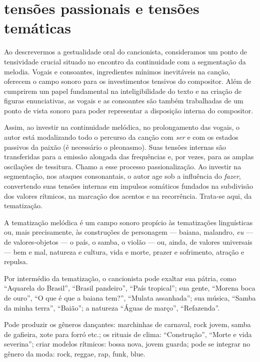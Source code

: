\section{tensões passionais e tensões temáticas}

Ao descrevermos a gestualidade oral do cancionista, consideramos um
ponto de tensividade crucial situado no encontro da continuidade com a
segmentação da melodia. Vogais e consoantes, ingredientes mínimos
inevitáveis na canção, oferecem o campo sonoro para os investimentos
tensivos do compositor. Além de cumprirem um papel fundamental na
inteligibilidade do texto e na criação de figuras enunciativas, as
vogais e as consoantes são também trabalhadas de um ponto de vista
sonoro para poder representar a disposição interna do compositor.

Assim, ao investir na continuidade melódica, no prolongamento das
vogais, o autor está modalizando todo o percurso da canção com \textit{ser} e
com os estados passivos da paixão (é necessário o pleonasmo). Suas
tensões internas são transferidas para a emissão alongada das
frequências e, por vezes, para as amplas oscilações de tessitura. Chamo
a esse processo passionalização. Ao investir na segmentação, nos ataques
consonantais, o autor age sob a influência do \textit{fazer}, convertendo suas
tensões internas em impulsos somáticos fundados na subdivisão dos
valores rítmicos, na marcação dos acentos e na recorrência. Trata-se
aqui, da tematização.

A tematização melódica é um campo sonoro propício às tematizações
linguísticas ou, mais precisamente, às construções de personagem --- baiana, malandro, \textit{eu} --- de valores-objetos --- o país, o samba, o violão --- ou, ainda, de valores universais --- bem e mal, natureza e cultura, vida e morte, prazer e sofrimento, atração e repulsa. 

Por intermédio da tematização, o cancionista pode exaltar sua pátria, como ``Aquarela do Brasil'', ``Brasil
pandeiro'', ``País tropical''; sua gente, ``Morena boca de ouro'', ``O que é que a
baiana tem?'', ``Mulata assanhada''; sua música, ``Samba da minha terra'',
``Baião''; a natureza ``Águas de março'', ``Refazenda''. 

Pode produzir os gêneros dançantes: marchinhas de carnaval, rock jovem, samba de gafieira, xote
para forró etc.; os rituais de clima: ``Construção'', ``Morte e vida
severina''; criar modelos rítmicos: bossa nova, jovem guarda; pode
se integrar no gênero da moda: rock, reggae, rap, funk, blue. 

